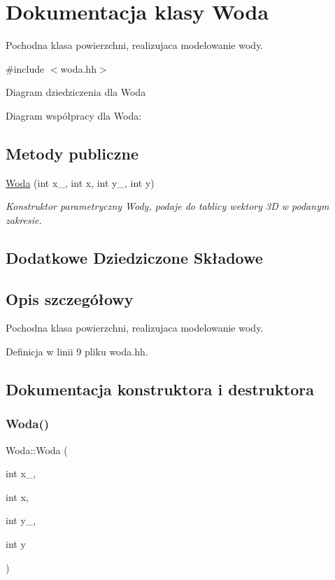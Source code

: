 \hypertarget{class_woda}{}\section{Dokumentacja klasy Woda}
\label{class_woda}


Pochodna klasa powierzchni, realizujaca modelowanie wody.  




{\ttfamily \#include $<$woda.\+hh$>$}



Diagram dziedziczenia dla Woda


Diagram współpracy dla Woda\+:
\subsection*{Metody publiczne}
\begin{DoxyCompactItemize}
\item 
\hyperlink{class_woda_a6e23ded4aa8861f9146df710623df628}{Woda} (int x\+\_, int x, int y\+\_, int y)
\begin{DoxyCompactList}\small\item\em Konstruktor parametryczny Wody, podaje do tablicy wektory 3D w podanym zakresie. \end{DoxyCompactList}\end{DoxyCompactItemize}
\subsection*{Dodatkowe Dziedziczone Składowe}


\subsection{Opis szczegółowy}
Pochodna klasa powierzchni, realizujaca modelowanie wody. 

Definicja w linii 9 pliku woda.\+hh.



\subsection{Dokumentacja konstruktora i destruktora}
\mbox{\label{class_woda_a6e23ded4aa8861f9146df710623df628}} 
\subsubsection{\texorpdfstring{Woda()}{Woda()}}
{\footnotesize\ttfamily Woda\+::\+Woda (\begin{DoxyParamCaption}\item[{int}]{x\+\_,  }\item[{int}]{x,  }\item[{int}]{y\+\_,  }\item[{int}]{y }\end{DoxyParamCaption})}



